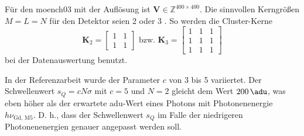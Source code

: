 \noindent
Für den \gls{moench03} mit der Auflösung  ist $\mathbf{V} \in \mathbb{Z}^{400\times 400}$. Die sinnvollen Kerngrößen $M=L=N$ für den Detektor seien 2 oder 3 \cite[Abschnitt 4]{cartier_micron_2014}. So werden die Cluster-Kerne
\begin{equation}
    \mathbf{K}_{2} = \begin{bmatrix}
1 & 1\\
1 & 1
\end{bmatrix}
\text{ bzw. }
    \mathbf{K}_{3} = \begin{bmatrix}
1 & 1 & 1\\
1 & 1 & 1\\
1 & 1 & 1
\end{bmatrix}
\end{equation}
bei der Datenauswertung benutzt.

\noindent
In der Referenzarbeit wurde der Parameter $c$ von 3 bis 5 variiertet. Der Schwellenwert $s_Q = cN\sigma$ mit $c=5$ und $N=2$ gleicht dem Wert $\SI{200}{\adu}$, was eben höher als der erwartete \gls{adu}-Wert eines Photons mit Photonenenergie $h\nu_\text{Gd, M5}$. D. h., dass der Schwellenwert $s_Q$ im Falle der niedrigeren Photonenenergien genauer angepasst werden soll.